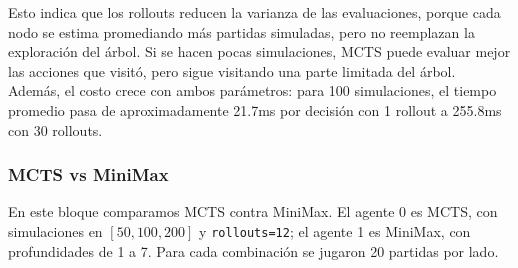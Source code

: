 \documentclass[letterpaper,12pt]{article}
\begin{document}
Esto indica que los rollouts reducen la varianza de las evaluaciones, porque cada nodo se estima promediando más partidas simuladas, pero no reemplazan la exploración del árbol. Si se hacen pocas simulaciones, MCTS puede evaluar mejor las acciones que visitó, pero sigue visitando una parte limitada del árbol. Además, el costo crece con ambos parámetros: para 100 simulaciones, el tiempo promedio pasa de aproximadamente 21.7ms por decisión con 1 rollout a 255.8ms con 30 rollouts.



\subsubsection*{MCTS vs MiniMax}

En este bloque comparamos MCTS contra MiniMax. El agente 0 es MCTS, con simulaciones en $[50,100,200]$ y \texttt{rollouts=12}; el agente 1 es MiniMax, con profundidades de 1 a 7. Para cada combinación se jugaron 20 partidas por lado.
\end{document}
